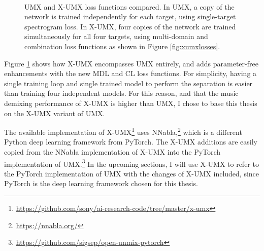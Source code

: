 \documentclass[report.tex]{subfiles}
\begin{document}
\begin{figure}[ht]
	\centering
	\\
	\caption{UMX and X-UMX loss functions compared. In UMX, a copy of the network is trained independently for each target, using single-target spectrogram loss. In X-UMX, four copies of the network are trained simultaneously for all four targets, using multi-domain and combination loss functions as shown in Figure \ref{fig:xumxlosses}.}
	\label{fig:umxandxumx}
\end{figure}

Figure \ref{fig:umxandxumx} shows how X-UMX encompasses UMX entirely, and adds parameter-free enhancements with the new MDL and CL loss functions. For simplicity, having a single training loop and single trained model to perform the separation is easier than training four independent models. For this reason, and that the music demixing performance of X-UMX is higher than UMX, I chose to base this thesis on the X-UMX variant of UMX.

The available implementation of X-UMX\footnote{\url{https://github.com/sony/ai-research-code/tree/master/x-umx}} uses NNabla,\footnote{\url{https://nnabla.org/}} which is a different Python deep learning framework from PyTorch. The X-UMX additions are easily copied from the NNabla implementation of X-UMX into the PyTorch implementation of UMX.\footnote{\url{https://github.com/sigsep/open-unmix-pytorch}} In the upcoming sections, I will use X-UMX to refer to the PyTorch implementation of UMX with the changes of X-UMX included, since PyTorch is the deep learning framework chosen for this thesis.
\end{document}
